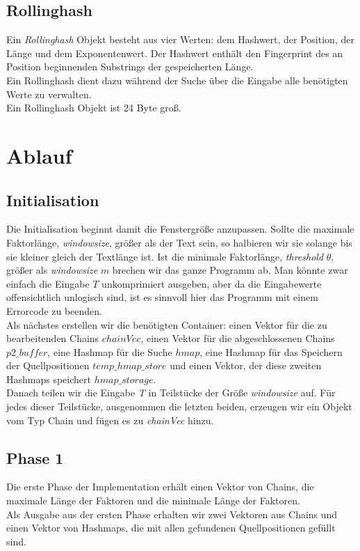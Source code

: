 \subsection{Rollinghash}

Ein \textit{Rollinghash} Objekt besteht aus vier Werten: dem Hashwert, der Position, der Länge und dem Exponentenwert.
Der Hashwert enthält den Fingerprint des an Position beginnenden Substrings der gespeicherten Länge. \\
Ein Rollinghash dient dazu während der Suche über die Eingabe alle benötigten Werte zu verwalten.\\
Ein Rollinghash Objekt ist 24 Byte groß.


\section{Ablauf}

\subsection{Initialisation}

Die Initialisation beginnt damit die Fenstergröße anzupassen.
Sollte die maximale Faktorlänge, \textit{windowsize}, größer als der Text sein, so halbieren wir sie solange bis sie kleiner gleich  der Textlänge ist.
Ist die minimale Faktorlänge, \textit{threshold} $\theta$, größer als \textit{windowsize} $m$ brechen wir das ganze Programm ab.
Man könnte zwar einfach die Eingabe $T$ unkomprimiert ausgeben, aber da die Eingabewerte offensichtlich unlogisch sind, ist es sinnvoll hier das Programm mit einem Errorcode zu beenden.\\
Als nächstes erstellen wir die benötigten Container: einen Vektor für die zu bearbeitenden Chains $chainVec$, einen Vektor für die abgeschlossenen Chains  $p2\_buffer$, eine Hashmap für die Suche $hmap$, eine Hashmap für das Speichern der Quellpositionen $temp\_hmap\_store$ und einen Vektor, der diese zweiten Hashmaps speichert $hmap\_storage$.\\
Danach teilen wir die Eingabe \textit{T} in Teilstücke der Größe \textit{windowsize} auf.
Für jedes dieser Teilstücke, ausgenommen die letzten beiden, erzeugen wir ein Objekt vom Typ Chain und fügen es zu \textit{chainVec} hinzu.\\

\subsection{Phase 1}
Die erste Phase der Implementation erhält einen Vektor von Chains, die maximale Länge der Faktoren und die minimale Länge der Faktoren.\\
Als Ausgabe aus der ersten Phase erhalten wir zwei Vektoren aus Chains und einen Vektor von Hashmaps,  die mit allen gefundenen Quellpositionen gefüllt sind.\\

